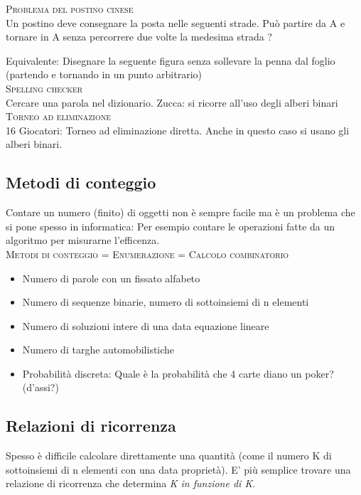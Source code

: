 \documentclass[12pt,a4paper]{article}
\begin{document}
\textsc{Problema del postino cinese} \\
Un postino deve consegnare la posta nelle seguenti strade. Può partire da A e tornare in A senza percorrere due volte
la medesima strada ? \par
Equivalente: Disegnare la seguente figura senza sollevare la penna dal foglio (partendo e tornando in un punto
arbitrario) \\

\textsc{Spelling checker} \\
Cercare una parola nel dizionario. Zucca: si ricorre all'uso degli alberi binari \\

\textsc{Torneo ad eliminazione} \\
16 Giocatori: Torneo ad eliminazione diretta. Anche in questo caso si usano gli alberi binari.

\subsection{Metodi di conteggio} 
Contare un numero (finito) di oggetti non è sempre facile ma è un problema che si pone spesso in
informatica: Per esempio contare le operazioni fatte da un algoritmo per misurarne l'efficenza. \\

\textsc{Metodi di conteggio = Enumerazione = Calcolo combinatorio}
 \\

\begin{itemize}
        \item Numero di parole con un fissato alfabeto
\item Numero di sequenze binarie, numero di sottoinsiemi di n elementi
\item Numero di soluzioni intere di una data equazione lineare
\item Numero di targhe automobilistiche
\item Probabilità discreta: Quale è la probabilità che 4 carte diano un poker? (d'assi?)
\end{itemize}

\subsection{Relazioni di ricorrenza}
    Spesso è difficile calcolare direttamente una quantità (come il numero K
di sottoinsiemi di n
elementi con una data proprietà). E' più semplice trovare una relazione di ricorrenza che
determina \textit{K in funzione di K}. \\
\end{document}
